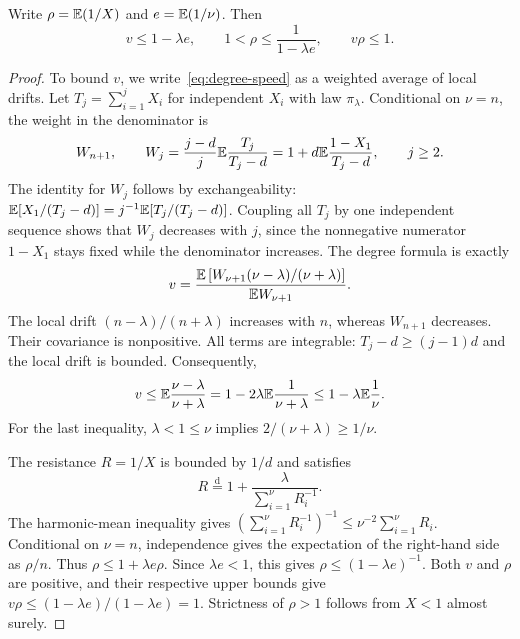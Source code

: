 \begin{lemma}\label{lem:resistance}
Write $\rho=\mathbb E(1/X)$ and $e=\mathbb E(1/\nu)$. Then
\begin{equation}\label{eq:resistance}
 v\le1-\lambda e,\qquad
 1<\rho\le\frac1{1-\lambda e},\qquad v\rho\le1.
\end{equation}
\end{lemma}

\begin{proof}
To bound $v$, we write~\eqref{eq:degree-speed} as a weighted average of local drifts. Let $T_j=\sum_{i=1}^jX_i$ for independent $X_i$ with law $\pi_\lambda$. Conditional on $\nu=n$, the weight in the denominator is
\begin{equation*}
 W_{n+1},\qquad
 W_j=\frac{j-d}{j}\mathbb E\frac{T_j}{T_j-d}
 =1+d\mathbb E\frac{1-X_1}{T_j-d},\qquad j\ge2.
\end{equation*}
The identity for $W_j$ follows by exchangeability: $\mathbb E[X_1/(T_j-d)]=j^{-1}\mathbb E[T_j/(T_j-d)]$. Coupling all $T_j$ by one independent sequence shows that $W_j$ decreases with $j$, since the nonnegative numerator $1-X_1$ stays fixed while the denominator increases. The degree formula is exactly
\[
 v=\frac{\mathbb E\left[W_{\nu+1}(\nu-\lambda)/(\nu+\lambda)\right]}
 {\mathbb E W_{\nu+1}}.
\]
The local drift $(n-\lambda)/(n+\lambda)$ increases with $n$, whereas $W_{n+1}$ decreases. Their covariance is nonpositive. All terms are integrable: $T_j-d\ge(j-1)d$ and the local drift is bounded. Consequently,
\begin{equation*}
 v\le\mathbb E\frac{\nu-\lambda}{\nu+\lambda}
 =1-2\lambda\mathbb E\frac1{\nu+\lambda}
 \le1-\lambda\mathbb E\frac1\nu.
\end{equation*}
For the last inequality, $\lambda<1\le\nu$ implies $2/(\nu+\lambda)\ge1/\nu$.

The resistance $R=1/X$ is bounded by $1/d$ and satisfies
\begin{equation*}
 R\overset{\mathrm d}=1+\frac{\lambda}{\sum_{i=1}^{\nu}R_i^{-1}}.
\end{equation*}
The harmonic-mean inequality gives $(\sum_{i=1}^{\nu}R_i^{-1})^{-1}\le\nu^{-2}\sum_{i=1}^{\nu}R_i$. Conditional on $\nu=n$, independence gives the expectation of the right-hand side as $\rho/n$. Thus $\rho\le1+\lambda e\rho$. Since $\lambda e<1$, this gives $\rho\le(1-\lambda e)^{-1}$. Both $v$ and $\rho$ are positive, and their respective upper bounds give $v\rho\le(1-\lambda e)/(1-\lambda e)=1$. Strictness of $\rho>1$ follows from $X<1$ almost surely.
\end{proof}

